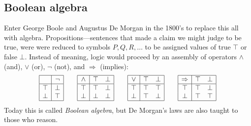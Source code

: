 \subsection{Boolean algebra}
Enter
George Boole and Augustus De Morgan in the 1800's to replace 
this all with algebra.  Propositions---sentences that made a 
claim we might judge to be true, were 
were reduced to symbols $P,Q,R,\ldots$
to be assigned values of true $\top$ or false $\bot$. 
Instead of meaning, logic would proceed by an assembly of 
operators $\wedge$ (and), $\vee$ (or), $\neg$ (not), and $\Rightarrow$ (implies):
\begin{gather*}
    \begin{array}{|c|c|}
        \hline 
         & \neg \\
        \hline 
        \top & \bot \\
        \bot & \top\\
        \hline
    \end{array}
    \qquad
    \begin{array}{|c|cc|}
        \hline 
        \wedge & \top & \bot\\
        \hline 
        \top & \top & \bot \\
        \bot & \bot & \bot\\
        \hline
    \end{array}
    \qquad 
    \begin{array}{|c|cc|}
        \hline 
        \vee & \top & \bot\\
        \hline 
        \top & \top & \top \\
        \bot & \top & \bot\\
        \hline
    \end{array}
    \qquad
    \begin{array}{|c|cc|}
        \hline 
        \Rightarrow & \top & \bot\\
        \hline 
        \top & \top & \bot \\
        \bot & \top & \top\\
        \hline
    \end{array}
\end{gather*}
Today this is called \emph{Boolean algebra}, but De Morgan's laws 
are also taught to those who reason.

